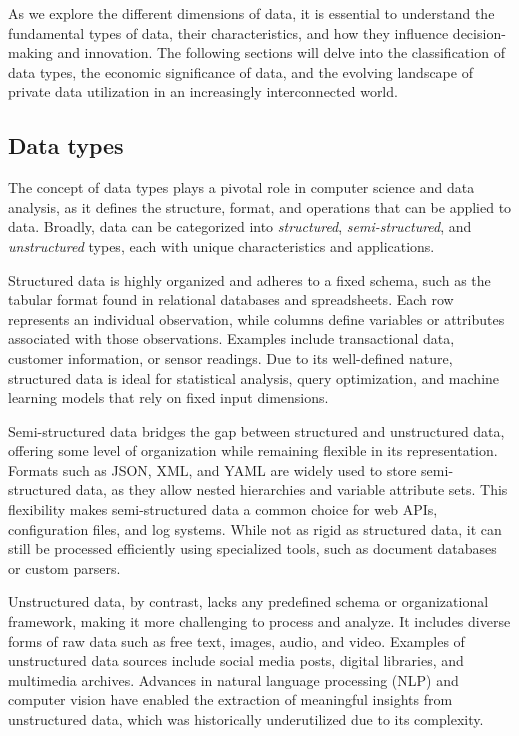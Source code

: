 As we explore the different dimensions of data, it is essential to understand the fundamental types of data, their characteristics, and how they influence decision-making and innovation. The following sections will delve into the classification of data types, the economic significance of data, and the evolving landscape of private data utilization in an increasingly interconnected world.
\subsection{Data types}

The concept of data types plays a pivotal role in computer science and data analysis, as it defines the structure, format, and operations that can be applied to data. Broadly, data can be categorized into \textit{structured}, \textit{semi-structured}, and \textit{unstructured} types, each with unique characteristics and applications.

Structured data is highly organized and adheres to a fixed schema, such as the tabular format found in relational databases and spreadsheets. Each row represents an individual observation, while columns define variables or attributes associated with those observations. Examples include transactional data, customer information, or sensor readings. Due to its well-defined nature, structured data is ideal for statistical analysis, query optimization, and machine learning models that rely on fixed input dimensions.

Semi-structured data bridges the gap between structured and unstructured data, offering some level of organization while remaining flexible in its representation. Formats such as JSON, XML, and YAML are widely used to store semi-structured data, as they allow nested hierarchies and variable attribute sets. This flexibility makes semi-structured data a common choice for web APIs, configuration files, and log systems. While not as rigid as structured data, it can still be processed efficiently using specialized tools, such as document databases or custom parsers.

Unstructured data, by contrast, lacks any predefined schema or organizational framework, making it more challenging to process and analyze. It includes diverse forms of raw data such as free text, images, audio, and video. Examples of unstructured data sources include social media posts, digital libraries, and multimedia archives. Advances in natural language processing (NLP) and computer vision have enabled the extraction of meaningful insights from unstructured data, which was historically underutilized due to its complexity.

